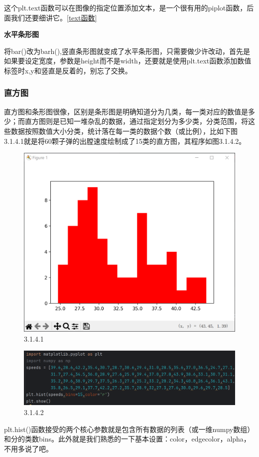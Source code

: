 \documentclass[12pt]{article}
\begin{document}
这个plt.text函数可以在图像的指定位置添加文本，是一个很有用的piplot函数，后面我们还要细讲它。\ref{text函数}

\noindent\textbf{水平条形图}

将bar()改为barh(),竖直条形图就变成了水平条形图，只需要做少许改动，首先是如果要设定宽度，参数是height而不是width，还要就是使用plt.text函数添加数值标签时x,y和竖直是反着的，别忘了交换。



\subsubsection{直方图}

直方图和条形图很像，区别是条形图是明确知道分为几类，每一类对应的数值是多少；而直方图则是已知一堆杂乱的数据，通过指定划分为多少类，分类范围，将这些数据按照数值大小分类，统计落在每一类的数据个数（或比例），比如下图3.1.4.1就是将60颗子弹的出膛速度绘制成了15类的直方图，其程序如图3.1.4.2。
\begin{figure}[H]
    \centering
    \includegraphics[width=0.8\linewidth]{直方图 Pic1.png}
    \caption{3.1.4.1}
    \label{fig:enter-label}
\end{figure}
\begin{figure}[H]
    \centering
    \includegraphics[width=0.75\linewidth]{直方图 program1.png}
    \caption{3.1.4.2}
    \label{fig:enter-label}
\end{figure}
plt.hist()函数接受的两个核心参数就是包含所有数据的列表（或一维numpy数组）和分的类数bins。此外就是我们熟悉的一下基本设置：color，edgecolor，alpha，不用多说了吧。
\end{document}
